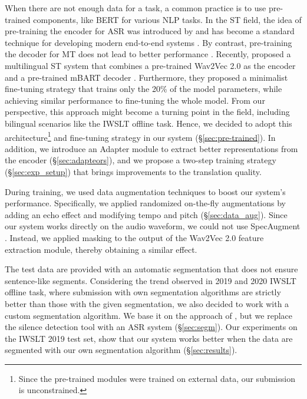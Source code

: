 \documentclass[11pt,a4paper]{article}
\begin{document}
    When there are not enough data for a task, a common practice is to use pre-trained components, like BERT \cite{bert} for various NLP tasks. In the ST field, the idea of pre-training the encoder for ASR was introduced by \citet{asr-pretrain} and has become a standard technique for developing modern end-to-end systems \cite{asr-pretrain-ex1,asr-pretrain-ex2}. By contrast, pre-training the decoder for MT does not lead to better performance \cite{no-mt-pretrain}. Recently, \citet{lna} proposed a multilingual ST system that combines a pre-trained Wav2Vec 2.0 \cite{wav2vec2.0} as the encoder and a pre-trained mBART decoder \cite{mBART}. Furthermore, they proposed a minimalist fine-tuning strategy that trains only the 20\% of the model parameters, while achieving similar performance to fine-tuning the whole model. From our perspective, this approach might become a turning point in the field, including bilingual scenarios like the IWSLT offline task. Hence, we decided to adopt this architecture\footnote{Since the pre-trained modules were trained on external data, our submission is unconstrained.} and fine-tuning strategy in our system (\S\ref{sec:pre-trained}). In addition, we introduce an Adapter module to extract better representations from the encoder (\S\ref{sec:adapteors}), and we propose a two-step training strategy (\S\ref{sec:exp_setup}) that brings improvements to the translation quality.

    During training, we used data augmentation techniques to boost our system's performance. Specifically, we applied randomized on-the-fly augmentations by adding an echo effect and modifying tempo and pitch (\S\ref{sec:data_aug}). Since our system works directly on the audio waveform, we could not use SpecAugment \cite{specaugment,specaugment-st}. Instead, we applied masking to the output of the Wav2Vec 2.0 feature extraction module, thereby obtaining a similar effect.

    The test data are provided with an automatic segmentation that does not ensure sentence-like segments. Considering the trend observed in 2019 and 2020 IWSLT offline task, where submission with own segmentation algorithms are strictly better than those with the given segmentation, we also decided to work with a custom segmentation algorithm. We base it on the approach of \citet{srpol2019}, but we replace the silence detection tool with an ASR system (\S\ref{sec:segm}). Our experiments on the IWSLT 2019 test set, show that our system works better when the data are segmented with our own segmentation algorithm (\S\ref{sec:results}).
\end{document}
